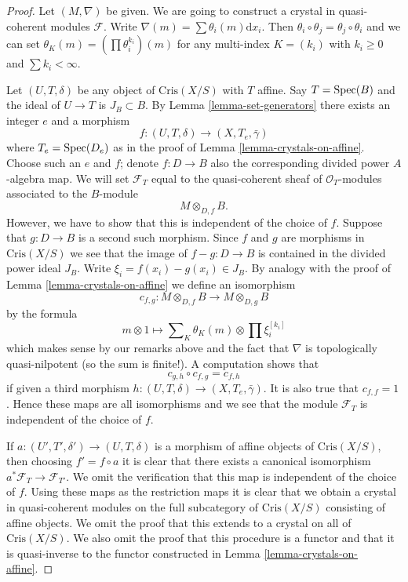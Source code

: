 \begin{proof}
Let $(M, \nabla)$ be given. We are going to construct
a crystal in quasi-coherent modules $\mathcal{F}$.
Write $\nabla(m) = \sum \theta_i(m)\text{d}x_i$.
Then $\theta_i \circ \theta_j = \theta_j \circ \theta_i$ and we
can set $\theta_K(m) = (\prod \theta_i^{k_i})(m)$ for any multi-index
$K = (k_i)$ with $k_i \geq 0$ and $\sum k_i < \infty$.

\medskip\noindent
Let $(U, T, \delta)$ be any object of $\text{Cris}(X/S)$ with $T$ affine.
Say $T = \mathop{\mathrm{Spec}}(B)$ and the ideal of $U \to T$ is $J_B \subset B$.
By Lemma \ref{lemma-set-generators} there exists an integer $e$ and a morphism
$$
f : (U, T, \delta) \longrightarrow (X, T_e, \bar\gamma)
$$
where $T_e = \mathop{\mathrm{Spec}}(D_e)$ as in the proof of
Lemma \ref{lemma-crystals-on-affine}.
Choose such an $e$ and $f$; denote $f : D \to B$ also the corresponding
divided power $A$-algebra map. We will set $\mathcal{F}_T$ equal to the
quasi-coherent sheaf of $\mathcal{O}_T$-modules associated to the $B$-module
$$
M \otimes_{D, f} B.
$$
However, we have to show that this is independent of the choice of $f$.
Suppose that $g : D \to B$ is a second such morphism. Since $f$ and $g$
are morphisms in $\text{Cris}(X/S)$ we see that the image of
$f - g : D \to B$ is contained in the divided power ideal $J_B$.
Write $\xi_i = f(x_i) - g(x_i) \in J_B$. By analogy with the proof
of Lemma \ref{lemma-crystals-on-affine} we define an isomorphism
$$
c_{f, g} : M \otimes_{D, f} B \longrightarrow M \otimes_{D, g} B
$$
by the formula
$$
m \otimes 1 \longmapsto 
\sum\nolimits_K \theta_K(m) \otimes \prod \xi_i^{[k_i]}
$$
which makes sense by our remarks above and the fact that $\nabla$
is topologically quasi-nilpotent (so the sum is finite!).
A computation shows that
$$
c_{g, h} \circ c_{f, g} = c_{f, h}
$$
if given a third morphism
$h : (U, T, \delta) \longrightarrow (X, T_e, \bar\gamma)$.
It is also true that $c_{f, f} = 1$.
Hence these maps are all isomorphisms and we see that
the module $\mathcal{F}_T$ is independent of the choice of $f$.

\medskip\noindent
If $a : (U', T', \delta') \to (U, T, \delta)$ is a morphism of affine objects
of $\text{Cris}(X/S)$, then choosing $f' = f \circ a$ it is clear
that there exists a canonical isomorphism
$a^*\mathcal{F}_T \to \mathcal{F}_{T'}$. We omit the verification that this
map is independent of the choice of $f$. Using these maps as the restriction
maps it is clear that we obtain a crystal in quasi-coherent modules
on the full subcategory of $\text{Cris}(X/S)$ consisting of affine objects.
We omit the proof that this extends to a crystal on all of
$\text{Cris}(X/S)$. We also omit the proof that this procedure is a functor
and that it is quasi-inverse to the functor constructed in
Lemma \ref{lemma-crystals-on-affine}.
\end{proof}


